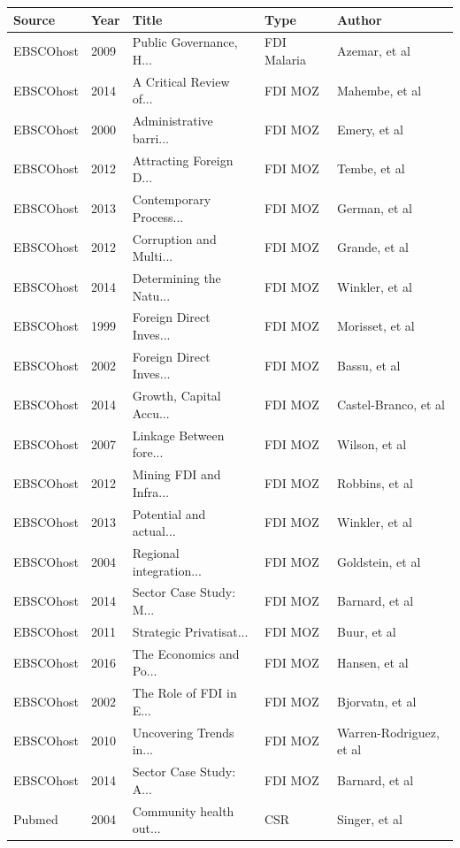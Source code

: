 \documentclass[]{elsarticle} %
\begin{document}
\begin{longtable}{lllll}
  \hline
Source & Year & Title & Type & Author \\ 
  \hline
EBSCOhost & 2009 & Public Governance, H... & FDI Malaria & Azemar, et al \\ 
  EBSCOhost & 2014 & A Critical Review of... & FDI MOZ & Mahembe, et al \\ 
  EBSCOhost & 2000 & Administrative barri... & FDI MOZ & Emery, et al \\ 
  EBSCOhost & 2012 & Attracting Foreign D... & FDI MOZ & Tembe, et al \\ 
  EBSCOhost & 2013 & Contemporary Process... & FDI MOZ & German, et al \\ 
  EBSCOhost & 2012 & Corruption and Multi... & FDI MOZ & Grande, et al \\ 
  EBSCOhost & 2014 & Determining the Natu... & FDI MOZ & Winkler, et al \\ 
  EBSCOhost & 1999 & Foreign Direct Inves... & FDI MOZ & Morisset, et al \\ 
  EBSCOhost & 2002 & Foreign Direct Inves... & FDI MOZ & Bassu, et al \\ 
  EBSCOhost & 2014 & Growth, Capital Accu... & FDI MOZ & Castel-Branco, et al \\ 
  EBSCOhost & 2007 & Linkage Between fore... & FDI MOZ & Wilson, et al \\ 
  EBSCOhost & 2012 & Mining FDI and Infra... & FDI MOZ & Robbins, et al \\ 
  EBSCOhost & 2013 & Potential and actual... & FDI MOZ & Winkler, et al \\ 
  EBSCOhost & 2004 & Regional integration... & FDI MOZ & Goldstein, et al \\ 
  EBSCOhost & 2014 & Sector Case Study: M... & FDI MOZ & Barnard, et al \\ 
  EBSCOhost & 2011 & Strategic Privatisat... & FDI MOZ & Buur, et al \\ 
  EBSCOhost & 2016 & The Economics and Po... & FDI MOZ & Hansen, et al \\ 
  EBSCOhost & 2002 & The Role of FDI in E... & FDI MOZ & Bjorvatn, et al \\ 
  EBSCOhost & 2010 & Uncovering Trends in... & FDI MOZ & Warren-Rodriguez, et al \\ 
  EBSCOhost & 2014 & Sector Case Study: A... & FDI MOZ & Barnard, et al \\ 
  Pubmed & 2004 & Community health out... & CSR & Singer, et al \\ 

\end{longtable}
\end{document}
